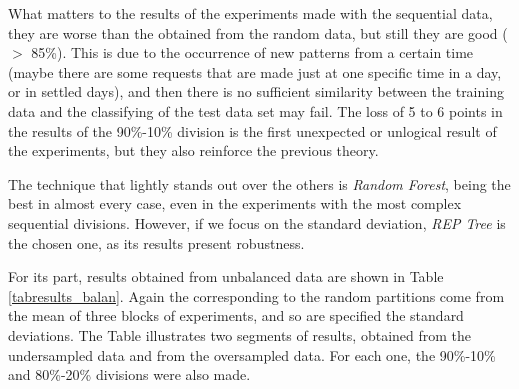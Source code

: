 \documentclass{llncs}
\begin{document}
What matters to the results of the experiments made with the sequential data, they are worse than the obtained from the random data, but still they are good ($>$ 85\%). This is due to the occurrence of new patterns from a certain time (maybe there are some requests that are made just at one specific time in a day, or in settled days), and then there is no sufficient similarity between the training data and the classifying of the test data set may fail. The loss of 5 to 6 points in the results of the 90\%-10\% division is the first unexpected or unlogical result of the experiments, but they also reinforce the previous theory.

The technique that lightly stands out over the others is
\textit{Random Forest}, being the best in almost every case, even in
the experiments with the most complex sequential divisions. However,
if we focus on the standard deviation, \textit{REP Tree} is the chosen
one, as its results present robustness. 

For its part, results obtained from unbalanced data are shown in Table \ref{tabresults_balan}. Again the corresponding to the random partitions come from the mean of three blocks of experiments, and so are specified the standard deviations. The Table illustrates two segments of results, obtained from the undersampled data and from the oversampled data. For each one, the 90\%-10\% and 80\%-20\% divisions were also made.
\end{document}
